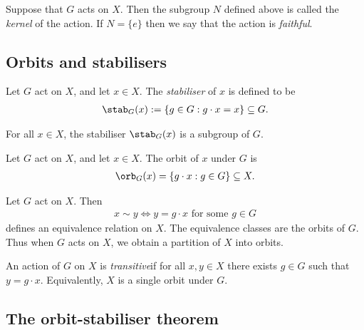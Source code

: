 \documentclass{article}
\begin{document}
\begin{definition}
    Suppose that $G$ acts on $X$. Then the subgroup $N$ defined above
    is called the \emph{kernel} of the action. If $N=\{e\}$ then we say that
    the action is \emph{faithful}.
\end{definition}

\subsection{Orbits and stabilisers}

\begin{definition}
    Let $G$ act on $X$, and let $x\in X$. The \emph{stabiliser} of $x$ is defined
    to be
    \begin{align*}
        \stab_G(x) :=\{g\in G:g\cdot x = x\}\subseteq G.
    \end{align*}
\end{definition}

\begin{lemma}
    For all $x\in X$, the stabiliser $\stab_G(x)$ is a subgroup of $G$.
\end{lemma}

\begin{definition}
    Let $G$ act on $X$, and let $x\in X$. The orbit of $x$ under $G$ is
    \begin{align*}
        \orb_G(x) = \{g\cdot x : g\in G\}\subseteq X.
    \end{align*}
\end{definition}

\begin{theorem}
    Let $G$ act on $X$. Then
    \begin{align*}
        x\sim y \Leftrightarrow y = g\cdot x \text{ for some }g\in G
    \end{align*}
    defines an equivalence relation on $X$. The equivalence classes are 
    the orbits of $G$. Thus when $G$ acts on $X$, we obtain a partition 
    of $X$ into orbits.
\end{theorem}

\setcounter{theorem}{6}
\begin{definition}
    An action of $G$ on $X$ is \emph{transitive}if for all $x,y\in X$ 
    there exists $g\in G$ such that $y=g\cdot x$. Equivalently, $X$ 
    is a single orbit under $G$.
\end{definition}

\subsection{The orbit-stabiliser theorem}
\end{document}
